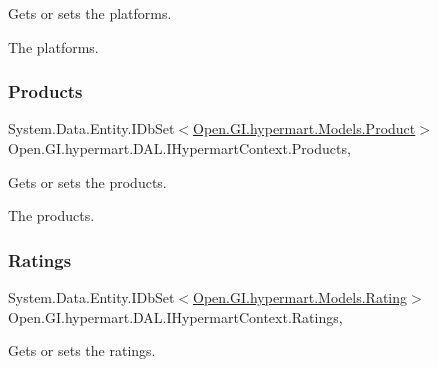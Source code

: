 Gets or sets the platforms. 

The platforms. \hypertarget{interface_open_1_1_g_i_1_1hypermart_1_1_d_a_l_1_1_i_hypermart_context_addebf65ed282146ad46149f0a4575ec7}{}\label{interface_open_1_1_g_i_1_1hypermart_1_1_d_a_l_1_1_i_hypermart_context_addebf65ed282146ad46149f0a4575ec7} 
\subsubsection{\texorpdfstring{Products}{Products}}
{\footnotesize\ttfamily System.\+Data.\+Entity.\+I\+Db\+Set$<$\hyperlink{class_open_1_1_g_i_1_1hypermart_1_1_models_1_1_product}{Open.\+G\+I.\+hypermart.\+Models.\+Product}$>$ Open.\+G\+I.\+hypermart.\+D\+A\+L.\+I\+Hypermart\+Context.\+Products\hspace{0.3cm}{\ttfamily [get]}, {\ttfamily [set]}}



Gets or sets the products. 

The products. \hypertarget{interface_open_1_1_g_i_1_1hypermart_1_1_d_a_l_1_1_i_hypermart_context_a4e1ab8903a144091a90920c6e3e62d32}{}\label{interface_open_1_1_g_i_1_1hypermart_1_1_d_a_l_1_1_i_hypermart_context_a4e1ab8903a144091a90920c6e3e62d32} 
\subsubsection{\texorpdfstring{Ratings}{Ratings}}
{\footnotesize\ttfamily System.\+Data.\+Entity.\+I\+Db\+Set$<$\hyperlink{class_open_1_1_g_i_1_1hypermart_1_1_models_1_1_rating}{Open.\+G\+I.\+hypermart.\+Models.\+Rating}$>$ Open.\+G\+I.\+hypermart.\+D\+A\+L.\+I\+Hypermart\+Context.\+Ratings\hspace{0.3cm}{\ttfamily [get]}, {\ttfamily [set]}}



Gets or sets the ratings. 

